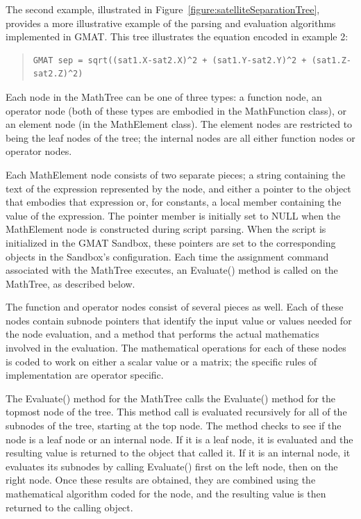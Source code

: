 The second example, illustrated in Figure~\ref{figure:satelliteSeparationTree},
provides a more illustrative example of the parsing and evaluation algorithms
implemented in GMAT.  This tree illustrates the equation encoded in example 2:

\begin{quote}\begin{verbatim}
GMAT sep = sqrt((sat1.X-sat2.X)^2 + (sat1.Y-sat2.Y)^2 + (sat1.Z-sat2.Z)^2)
\end{verbatim}\end{quote}

\noindent Each node in the MathTree can be one of three types: a
function node, an operator node (both of these types are embodied in the
MathFunction class), or an element node (in the MathElement class).  The
element nodes are restricted to being the leaf nodes of the tree; the internal
nodes are all either function nodes or operator nodes.

Each MathElement node consists of two separate pieces; a string containing the
text of the expression represented by the node, and either a pointer to the
object that embodies that expression or, for constants, a local member
containing the value of the expression.  The pointer member is initially set to NULL when the
MathElement node is constructed during script parsing.  When the
script is initialized in the GMAT Sandbox, these pointers are set to the
corresponding objects in the Sandbox's configuration.  Each time the assignment command associated
with the MathTree executes, an Evaluate() method is called
on the MathTree, as described below.

The function and operator nodes consist of several pieces as well.  Each of
these nodes contain subnode pointers that identify the input value or values
needed for the node evaluation, and a method that performs the actual
mathematics involved in the evaluation.  The mathematical operations for each
of these nodes is coded to work on either a scalar value or a matrix; the
specific rules of implementation are operator specific.

The Evaluate() method for the MathTree calls the Evaluate() method for the
topmost node of the tree.  This method call is evaluated recursively for all of the subnodes of the
tree, starting at the top node.  The method checks to see
if the node is a leaf node or an internal node.  If it is a leaf node, it is
evaluated and the resulting value is returned to the object that called it.  If it is an internal
node, it evaluates its subnodes by calling Evaluate() first
on the left node, then on the right node.  Once these results are obtained,
they are combined using the mathematical algorithm coded for the node, and the
resulting value is then returned to the calling object.

